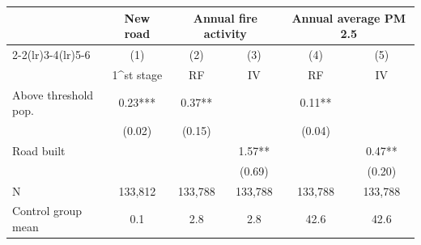 {
\def\sym#1{\ifmmode^{#1}\else\(^{#1}\)\fi}
\begin{tabular}{l*{5}{c}}
\hline\hline
                         &\multicolumn{1}{c}{New road}&\multicolumn{2}{c}{Annual fire activity}&\multicolumn{2}{c}{Annual average PM 2.5}\\\cmidrule(lr){2-2}\cmidrule(lr){3-4}\cmidrule(lr){5-6}
                         &\multicolumn{1}{c}{(1)}&\multicolumn{1}{c}{(2)}&\multicolumn{1}{c}{(3)}&\multicolumn{1}{c}{(4)}&\multicolumn{1}{c}{(5)}\\
                         &\multicolumn{1}{c}{1^{st} stage}&\multicolumn{1}{c}{RF}&\multicolumn{1}{c}{IV}&\multicolumn{1}{c}{RF}&\multicolumn{1}{c}{IV}\\
\hline
Above threshold pop.     &        0.23***&        0.37** &               &        0.11** &               \\
                         &      (0.02)   &      (0.15)   &               &      (0.04)   &               \\
[1em]
Road built               &               &               &        1.57** &               &        0.47** \\
                         &               &               &      (0.69)   &               &      (0.20)   \\
\hline
N                        &     133,812   &     133,788   &     133,788   &     133,788   &     133,788   \\
Control group mean       &         0.1   &         2.8   &         2.8   &        42.6   &        42.6   \\
\hline\hline
\end{tabular}
}
